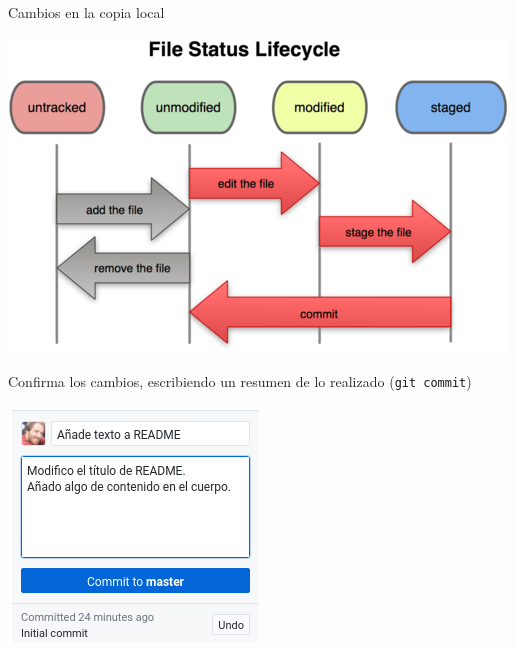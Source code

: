 \documentclass[xcolor={usenames,svgnames,dvipsnames}]{beamer}
\begin{document}
\begin{frame}[label={sec:org851c24f},fragile]{Cambios en la copia local}
 \begin{center}
\includegraphics[height=0.4\textheight]{figs/git_estados.png}
\end{center}

\alert{Confirma} los cambios, escribiendo un resumen de lo realizado (\texttt{git commit})
\begin{center}
\includegraphics[height=0.3\textheight]{figs/git_commit.png}
\end{center}
\end{frame}
\end{document}
